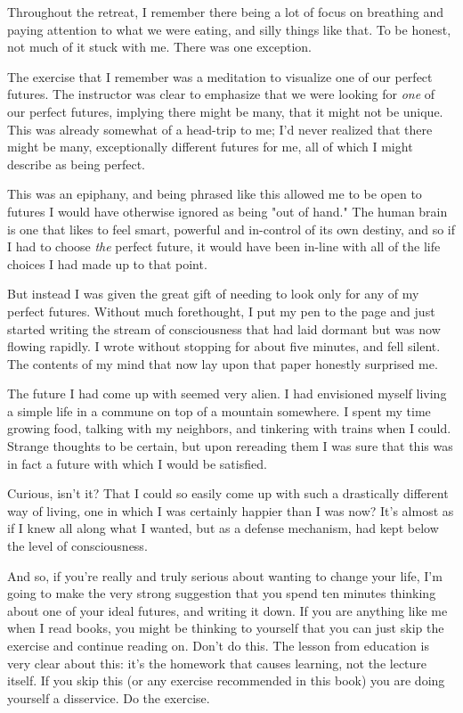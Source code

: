 \documentclass[]{book}
\begin{document}
Throughout the retreat, I remember there being a lot of focus on breathing and
paying attention to what we were eating, and silly things like that. To be
honest, not much of it stuck with me. There was one exception.

The exercise that I remember was a meditation to visualize one of our perfect
futures. The instructor was clear to emphasize that we were looking for
\textit{one} of our perfect futures, implying there might be many, that it might
not be unique. This was already somewhat of a head-trip to me; I'd never
realized that there might be many, exceptionally different futures for me, all
of which I might describe as being perfect.

This was an epiphany, and being phrased like this allowed me to be open to
futures I would have otherwise ignored as being "out of hand." The human brain
is one that likes to feel smart, powerful and in-control of its own destiny, and
so if I had to choose \textit{the} perfect future, it would have been in-line
with all of the life choices I had made up to that point.

But instead I was given the great gift of needing to look only for any of my
perfect futures. Without much forethought, I put my pen to the page and just
started writing the stream of consciousness that had laid dormant but was now
flowing rapidly. I wrote without stopping for about five minutes, and fell
silent. The contents of my mind that now lay upon that paper honestly surprised
me.

The future I had come up with seemed very alien. I had envisioned myself living
a simple life in a commune on top of a mountain somewhere. I spent my time
growing food, talking with my neighbors, and tinkering with trains when I could.
Strange thoughts to be certain, but upon rereading them I was sure that this was
in fact a future with which I would be satisfied.

Curious, isn't it? That I could so easily come up with such a drastically
different way of living, one in which I was certainly happier than I was now?
It's almost as if I knew all along what I wanted, but as a defense mechanism,
had kept below the level of consciousness.

And so, if you're really and truly serious about wanting to change your life,
I'm going to make the very strong suggestion that you spend ten minutes thinking
about one of your ideal futures, and writing it down. If you are anything like
me when I read books, you might be thinking to yourself that you can just skip
the exercise and continue reading on. Don't do this. The lesson from education
is very clear about this: it's the homework that causes learning, not the
lecture itself. If you skip this (or any exercise recommended in this book) you
are doing yourself a disservice. Do the exercise.
\end{document}
